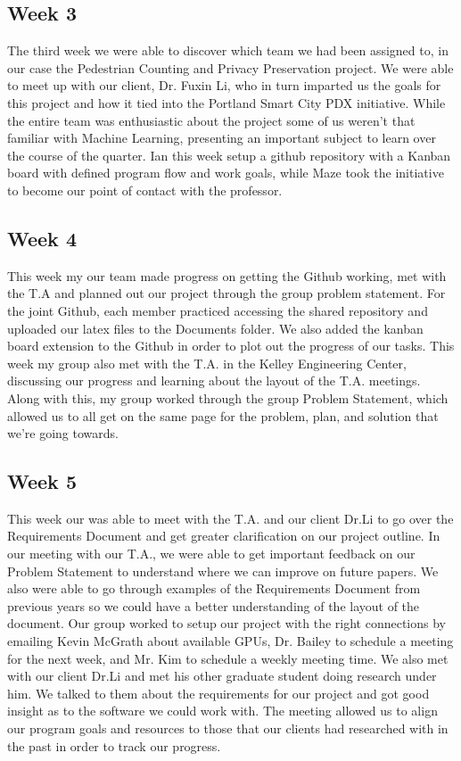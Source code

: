 \subsection{Week 3}
The third week we were able to discover which team we had been assigned to, in our case the Pedestrian Counting and Privacy Preservation project. We were able to meet up with our client, Dr. Fuxin Li, who in turn imparted us the goals for this project and how it tied into the Portland Smart City PDX initiative. While the entire team was enthusiastic about the project some of us weren’t that familiar with Machine Learning, presenting an important subject to learn over the course of the quarter. Ian this week setup a github repository with a Kanban board with defined program flow and work goals, while Maze took the initiative to become our point of contact with the professor.

\subsection{Week 4}
This week my our team made progress on getting the Github working, met with the T.A and planned out our project through the group problem statement. For the joint Github, each member practiced accessing the shared repository and uploaded our latex files to the Documents folder. We also added the kanban board extension to the Github in order to plot out the progress of our tasks. This week my group also met with the T.A. in the Kelley Engineering Center, discussing our progress and learning about the layout of the T.A. meetings. Along with this, my group worked through the group Problem Statement, which allowed us to all get on the same page for the problem, plan, and solution that we’re going towards. 

\subsection{Week 5}
This week our was able to meet with the T.A. and our client Dr.Li to go over the Requirements Document and get greater clarification on our project outline. In our meeting with our T.A., we were able to get important feedback on our Problem Statement to understand where we can improve on future papers. We also were able to go through examples of the Requirements Document from previous years so we could have a better understanding of the layout of the document. Our group worked to setup our project with the right connections by emailing Kevin McGrath about available GPUs, Dr. Bailey to schedule a meeting for the next week, and Mr. Kim to schedule a weekly meeting time. We also met with our client Dr.Li and met his other graduate student doing research under him. We talked to them about the requirements for our project and got good insight as to the software we could work with. The meeting allowed us to align our program goals and resources to those that our clients had researched with in the past in order to track our progress.

